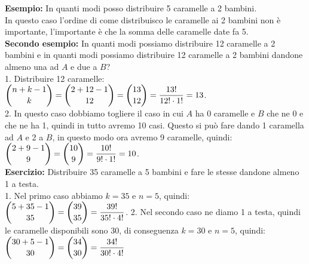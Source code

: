 \documentclass[12pt, letterpaper]{report}
\begin{document}
\begin{enumerate}
\begin{enumerate}
  				\textbf{Esempio:} In quanti modi posso distribuire 5 caramelle a 2 bambini. \\
  				In questo caso l'ordine di come distribuisco le caramelle ai 2 bambini non è importante, l'importante è che la somma delle caramelle date fa 5.
  				\\
  				\textbf{Secondo esempio:} In quanti modi possiamo distribuire 12 caramelle a 2 bambini e in quanti modi possiamo distribuire 12 caramelle a 2 bambini dandone almeno una ad $A$ e due a $B$? \\
  				1. Distribuire 12 caramelle: \\
  				$\mathlarger{\binom{n + k - 1}{k} = \binom{2+12-1}{12} = \binom{13}{12} = \frac{13!}{12! \cdot 1!} = 13}$. \\
  				2. In questo caso dobbiamo togliere il caso in cui $A$ ha 0 caramelle e $B$ che ne 0 e che ne ha 1, quindi in tutto avremo 10 casi. Questo si può fare dando 1 caramella ad $A$ e 2 a $B$, in questo modo ora avremo 9 caramelle, quindi: \\
  				$\mathlarger{\binom{2 + 9 -1}{9} = \binom{10}{9} = \frac{10!}{9! \cdot 1!} = 10}$.
  				\\
  				\textbf{Esercizio:} Distribuire 35 caramelle a 5 bambini e fare le stesse dandone almeno 1 a testa.
  				\\
  				1. Nel primo caso abbiamo $k=35$ e $n=5$, quindi: \\ $\mathlarger{\binom{5+35-1}{35} = \binom{39}{35} = \frac{39!}{35! \cdot 4!}}$.
  				2. Nel secondo caso ne diamo 1 a testa, quindi le caramelle disponibili sono 30, di conseguenza $k=30$ e $n=5$, quindi: \\
  				$\mathlarger{\binom{30+5-1}{30}=\binom{34}{30} = \frac{34!}{30! \cdot 4!}}$
  			\end{enumerate}
  		\end{enumerate}
\end{document}
